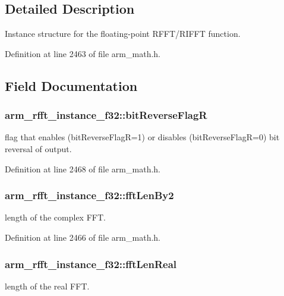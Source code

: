 \subsection{Detailed Description}
Instance structure for the floating-\/point R\-F\-F\-T/\-R\-I\-F\-F\-T function. 

Definition at line 2463 of file arm\-\_\-math.\-h.



\subsection{Field Documentation}
\hypertarget{structarm__rfft__instance__f32_ac342f3248157cbbd2f04a3c8ec9fc9eb}{
\subsubsection[{bit\-Reverse\-Flag\-R}]{ arm\-\_\-rfft\-\_\-instance\-\_\-f32\-::bit\-Reverse\-Flag\-R}}\label{structarm__rfft__instance__f32_ac342f3248157cbbd2f04a3c8ec9fc9eb}
flag that enables (bit\-Reverse\-Flag\-R=1) or disables (bit\-Reverse\-Flag\-R=0) bit reversal of output. 

Definition at line 2468 of file arm\-\_\-math.\-h.

\hypertarget{structarm__rfft__instance__f32_a075076e07ebb8521d8e3b49a31db6c57}{
\subsubsection[{fft\-Len\-By2}]{ arm\-\_\-rfft\-\_\-instance\-\_\-f32\-::fft\-Len\-By2}}\label{structarm__rfft__instance__f32_a075076e07ebb8521d8e3b49a31db6c57}
length of the complex F\-F\-T. 

Definition at line 2466 of file arm\-\_\-math.\-h.

\hypertarget{structarm__rfft__instance__f32_a4219d4669699e4efdcb150ed7a0d9a57}{
\subsubsection[{fft\-Len\-Real}]{ arm\-\_\-rfft\-\_\-instance\-\_\-f32\-::fft\-Len\-Real}}\label{structarm__rfft__instance__f32_a4219d4669699e4efdcb150ed7a0d9a57}
length of the real F\-F\-T. 

